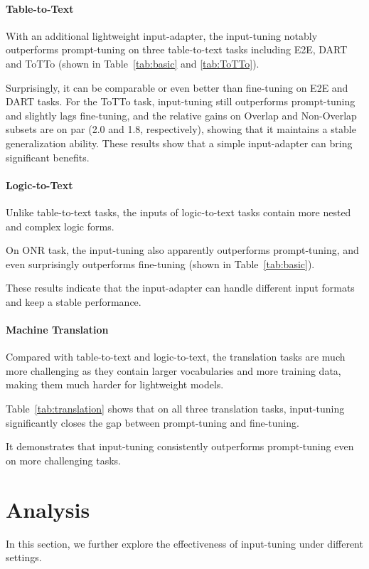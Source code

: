 \paragraph{Table-to-Text}
With an additional lightweight input-adapter, the input-tuning notably outperforms prompt-tuning on three table-to-text tasks including E2E, DART and ToTTo (shown in Table~\ref{tab:basic} and \ref{tab:ToTTo}). 

Surprisingly, it can be comparable or even better than fine-tuning on E2E and DART tasks. For the ToTTo task, input-tuning still outperforms prompt-tuning and slightly lags fine-tuning, and the relative gains on Overlap and Non-Overlap subsets are on par (2.0 and 1.8, respectively), showing that it maintains a stable generalization ability. These results show that a simple input-adapter can bring significant benefits.

\paragraph{Logic-to-Text} 
Unlike table-to-text tasks, the inputs of logic-to-text tasks contain more nested and complex logic forms.

On ONR task, the input-tuning also apparently outperforms prompt-tuning, and even surprisingly outperforms fine-tuning (shown in Table~\ref{tab:basic}). 

These results indicate that the input-adapter can handle different input formats and keep a stable performance.

\paragraph{Machine Translation} Compared with table-to-text and logic-to-text, the translation tasks are much more challenging as they contain larger vocabularies and more training data, making them much harder for lightweight models.

Table~\ref{tab:translation} shows that on all three translation tasks, input-tuning significantly closes the gap between prompt-tuning and fine-tuning. 

It demonstrates that input-tuning consistently outperforms prompt-tuning even on more challenging tasks.

\section{Analysis}

In this section, we further explore the effectiveness of input-tuning under different settings.

